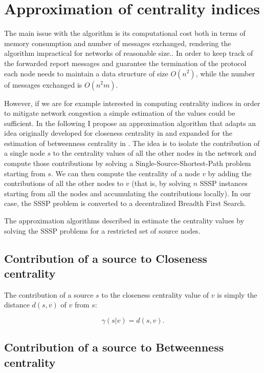 \section{Approximation of centrality indices}

The main issue with the \deccen{} algorithm is its computational cost both in terms of memory consumption and number of messages exchanged, rendering the algorithm impractical for networks of reasonable size.. In order to keep track of the forwarded report messages and guarantee the termination of the protocol each node needs to maintain a data structure of size $O(n^2)$, while the number of messages exchanged is $O(n^2m)$.

However, if we are for example interested in computing centrality indices in order to mitigate network congestion a simple estimation of the values could be sufficient. In the following I propose an approximation algorithm that adapts an idea originally developed for closeness centrality in \cite{ew2004} and expanded for the estimation of betweenness centrality in \cite{brandes2007}. The idea is to isolate the contribution of a single node $s$ to the centrality values of all the other nodes in the network and compute those contributions by solving a Single-Source-Shortest-Path problem starting from $s$. We can then compute the centrality of a node $v$ by adding the contributions of all the other nodes to $v$ (that is, by solving $n$ SSSP instances starting from all the nodes and accumulating the contributions locally). In our case, the SSSP problem is converted to a decentralized Breadth First Search.

The approximation algorithms described in \cite{ew2004,brandes2007} estimate the centrality values by solving the SSSP problems for a restricted set of source nodes.

\subsection*{Contribution of a source to Closeness centrality}

The contribution of a source $s$ to the closeness centrality value of $v$ is simply the distance $d(s,v)$ of $v$ from $s$:

\begin{equation}
\gamma(s|v) = d(s,v) .
\end{equation}

\subsection*{Contribution of a source to Betweenness centrality}

